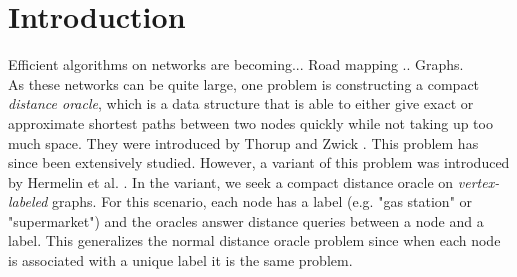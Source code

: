 \section{Introduction}
\label{sec:introduction}
Efficient algorithms on networks are becoming... Road mapping .. Graphs. \\
As these networks can be quite large, one problem is constructing a compact \textit{distance
oracle}, which is a data structure that is able to either give exact or approximate
shortest paths between two nodes quickly while not taking up too much space. They were
introduced by Thorup and Zwick \cite{thorup2005approximate}. This problem has since been
extensively studied. However, a variant of this problem
was introduced by Hermelin et al. \cite{hermelin2011distance}. In the variant, we seek a
compact distance oracle on \textit{vertex-labeled} graphs. For this scenario, each node has a label (e.g. "gas
station" or "supermarket") and the oracles answer distance queries between a node and a
label. This generalizes the normal distance oracle problem since when each node is
associated with a unique label it is the same problem. \\
